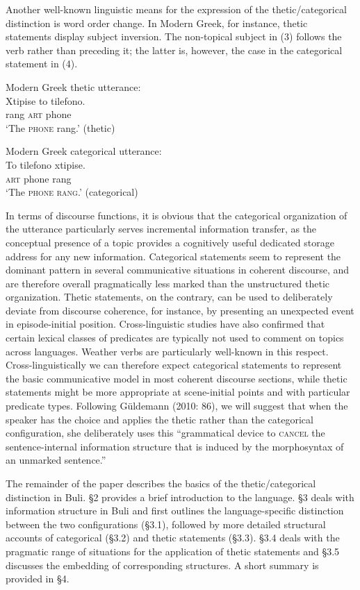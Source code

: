 \documentclass[output=paper]{langsci/langscibook}
\begin{document}
Another well-known linguistic means for the expression of the thetic/categorical distinction is word order change. In Modern Greek, for instance, thetic statements display subject inversion. The non-topical subject in (3) follows the verb rather than preceding it; the latter is, however, the case in the categorical statement in (4).

\ea
{ Modern Greek   thetic utterance:}\\
\gll Xtipise    to    tilefono. \\
     rang    \textsc{art}    phone\\
\glt ‘The \textsc{phone} rang.’ (thetic)
\z

\ea
{ Modern Greek   categorical utterance:}\\
\gll To     tilefono   xtipise.\\
     \textsc{art}    phone     rang\\
\glt ‘The \textsc{phone rang}.’ (categorical) \citep[536]{Sasse1987}
\z

In terms of discourse functions, it is obvious that the categorical organization of the utterance particularly serves incremental information transfer, as the conceptual presence of a topic provides a cognitively useful dedicated storage address for any new information. Categorical statements seem to represent the dominant pattern in several communicative situations in coherent discourse, and are therefore overall pragmatically less marked than the unstructured thetic organization. Thetic statements, on the contrary, can be used to deliberately deviate from discourse coherence, for instance, by presenting an unexpected event in episode-initial position. Cross-linguistic studies \citep{Sasse1995} have also confirmed that certain lexical classes of predicates are typically not used to comment on topics across languages. Weather verbs are particularly well-known in this respect. Cross-linguistically we can therefore expect categorical statements to represent the basic communicative model in most coherent discourse sections, while thetic statements might be more appropriate at scene-initial points and with particular predicate types. Following Güldemann (2010: 86), we will suggest that when the speaker has the choice and applies the thetic rather than the categorical configuration, she deliberately uses this “grammatical device to \textsc{cancel} the sentence-internal information structure that is induced by the morphosyntax of an unmarked sentence.”

The remainder of the paper describes the basics of the thetic/categorical distinction in Buli. §2 provides a brief introduction to the language. §3 deals with information structure in Buli and first outlines the language-specific distinction between the two configurations (§3.1), followed by more detailed structural accounts of categorical (§3.2) and thetic statements (§3.3). §3.4 deals with the pragmatic range of situations for the application of thetic statements and §3.5 discusses the embedding of corresponding structures. A short summary is provided in §4.
\end{document}
